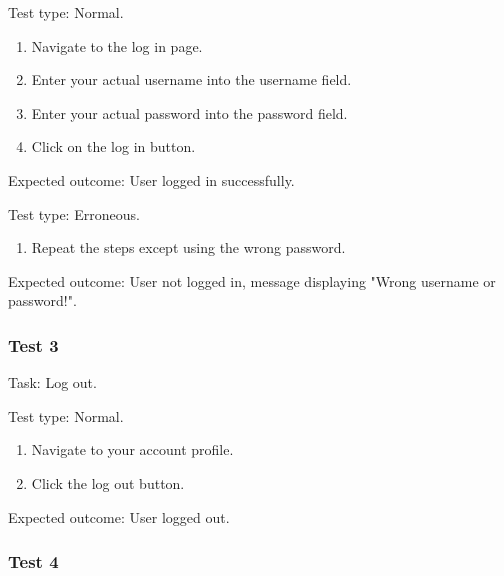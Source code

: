 {\color{gray} \hrulefill}

{\sffamily Test type: Normal.}\\

\begin{enumerate}
  \item Navigate to the log in page.
  \item Enter your actual username into the username field.
  \item Enter your actual password into the password field.
  \item Click on the log in button.
\end{enumerate}

{\sffamily Expected outcome:} User logged in successfully. \\ 

{\color{gray} \hrulefill}

{\sffamily Test type: Erroneous.}\\

\begin{enumerate}
  \item Repeat the steps except using the wrong password.
\end{enumerate}

{\sffamily Expected outcome:} User not logged in,
message displaying "Wrong username or password!". \\ 

{\color{gray} \hrulefill}

\subsubsection{Test 3}

{\sffamily Task:} Log out.\\ 

{\color{gray} \hrulefill}

{\sffamily Test type: Normal.}\\

\begin{enumerate}
  \item Navigate to your account profile.
  \item Click the log out button.
\end{enumerate}

{\sffamily Expected outcome:} User logged out. \\ 

{\color{gray} \hrulefill}

\subsubsection{Test 4}

